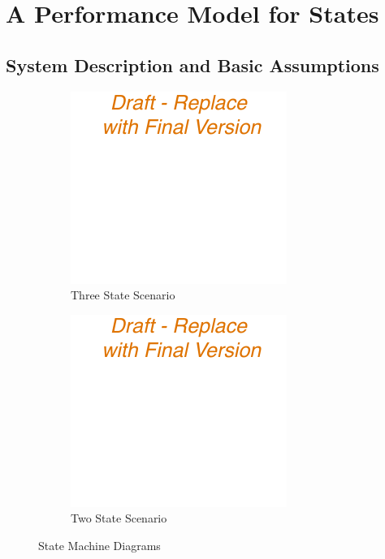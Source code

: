 \section{A Performance Model for   States}\label{sec:network:performance_model}
\cite{Schwartz2013c}

\subsection{System Description and Basic Assumptions}\label{sec:network:performance_model:system_description}
\begin{figure}
	\begin{subfigure}[b]{.5\textwidth}
	\centering
	\includegraphics{network/background/figures//three_states}
	\caption{Three State Scenario}\label{fig:network:background:rrc_state_machines:three_states}
	\end{subfigure}%
	\begin{subfigure}[b]{.5\textwidth}
	\centering
	\includegraphics{network/background/figures//two_states}
	\caption{Two State Scenario}\label{fig:network:background:rrc_state_machines:two_states}
	\end{subfigure}
	\caption{ State Machine Diagrams}\label{fig:network:background:rrc_state_machines}
\end{figure}

